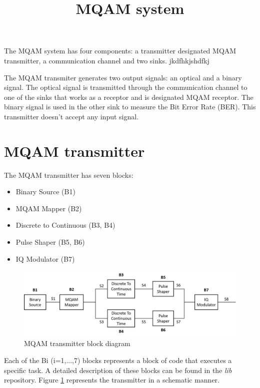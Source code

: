 \documentclass[a4paper]{article}
\title{MQAM system}
\begin{document}
	\maketitle
	
The MQAM system has four components: a transmitter designated MQAM transmitter, a communication channel and two sinks. jkdfhkjshdfkj

The MQAM transmiter generates two output signals: an optical and a binary signal. The optical signal is transmitted through the communication channel to one of the sinks that works as a receptor and is designated MQAM receptor. The binary signal is used in the other sink to measure the Bit Error Rate (BER). This transmitter doesn't accept any input signal.
	
\section*{MQAM transmitter}

The MQAM transmitter has seven blocks:

\begin{itemize}
	\item Binary Source (B1)
	\item MQAM Mapper (B2)
	\item Discrete to Continuous (B3, B4)
	\item Pulse Shaper (B5, B6)
	\item IQ Modulator (B7)
\end{itemize}

\begin{figure}
	\includegraphics[width=1.2\textwidth]{MQAM_transmitter_block_diagram}
	\caption{MQAM transmitter block diagram}
	\label{MQAM_system_block_diagram}
\end{figure}

Each of the Bi (i=1,...,7) blocks represents a block of code that executes a specific task. A detailed description of these blocks can be found in the \textit{lib} repository. Figure \ref{MQAM_system_block_diagram} represents the transmitter in a schematic manner.
\end{document}
